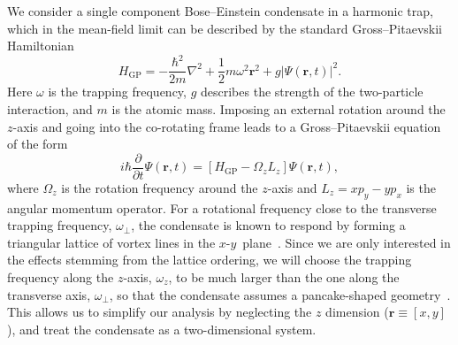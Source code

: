 We consider a single component Bose--Einstein condensate in a harmonic trap, which in the mean-field limit can be described by the standard Gross--Pitaevskii Hamiltonian
\begin{equation}\label{eqn:gpe_h0}
	H_\text{GP} = -\frac{\hbar^2}{2m}\nabla^2 + \frac{1}{2}m\omega^2\mathbf{r}^2 + g\vert\Psi(\mathbf{r},t)\vert^2.
\end{equation}
Here $\omega$ is the trapping frequency, $g$ describes the strength of the two-particle interaction, and $m$ is the atomic mass. Imposing an external rotation around the $z$-axis and going into the co-rotating frame leads to a Gross--Pitaevskii equation of the form
\begin{equation}\label{eqn:gpe}
	i\hbar\frac{\partial}{\partial t}\Psi(\mathbf{r},t) = \left[ H_\text{GP}  -  \Omega_z L_z\right] \Psi(\mathbf{r},t),
\end{equation}
where $\Omega_z$ is the rotation frequency around the $z$-axis and $L_z = xp_y - yp_x$ is the angular momentum operator. For a rotational frequency close to the transverse trapping frequency, $\omega_{\perp}$, the condensate is known to respond by forming a triangular lattice of vortex lines in the $x$\nobreakdash-$y$~plane~\cite{Vtx:AboShaeer_sci_2001}. Since we are only interested in the effects stemming from the lattice ordering, we will choose the trapping frequency along the $z$-axis, $\omega_z$, to be much larger than the one along the transverse axis, $\omega_\perp$, so that the condensate assumes a pancake-shaped geometry~\cite{BEC:Fetter_revmodphys_2009}. This allows us to simplify our analysis by neglecting the $z$ dimension ($\textbf{r}\equiv [x,y]$), and treat the condensate as a two-dimensional system.

